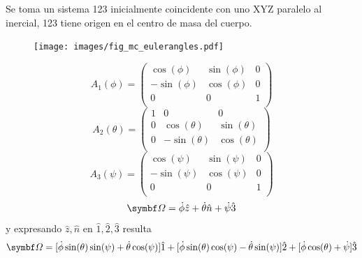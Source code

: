 \documentclass[10pt,oneside]{CBFT_book}
\begin{document}
Se toma un sistema 123 inicialmente coincidente con uno XYZ paralelo al inercial, 123 tiene origen
en el centro de masa del cuerpo.
\begin{figure}[htb]
	\begin{center}
	\texttt{[image: images/fig\_mc\_eulerangles.pdf]}	 
	\end{center}
	\caption{}
\end{figure} 
\[
	A_1(\phi) = 
	\begin{pmatrix}
		\cos(\phi) & \sin(\phi) & 0 \\
		-\sin(\phi) & \cos(\phi) & 0 \\ 
		0 & 0 & 1  \\
	\end{pmatrix}
\]
\[
	A_2(\theta) = 
	\begin{pmatrix}
		1 & 0 & 0 \\
		0 & \cos(\theta) & \sin(\theta) \\ 
		0 & -\sin(\theta) & \cos(\theta)  \\
	\end{pmatrix}
\]
\[
	A_3(\psi) = 
	\begin{pmatrix}
		\cos(\psi) & \sin(\psi) & 0 \\
		-\sin(\psi) & \cos(\psi) & 0 \\ 
		0 & 0 & 1  \\
	\end{pmatrix}
\]
\[
	\vb{\Omega} = \dot{\phi}\hat{z} + \dot{\theta}\hat{n} + \dot{\psi}\hat{3}
\]
y expresando $\hat{z},\hat{n}$ en $\hat{1},\hat{2}, \hat{3}$ resulta
\[
	\vb{\Omega} = [\dot{\phi}\sin(\theta)\sin(\psi) + \dot{\theta}\cos(\psi) ]\hat{1} +
			[\dot{\phi}\sin(\theta)\cos(\psi) - \dot{\theta}\sin(\psi) ] \hat{2} +
			[\dot{\phi}\cos(\theta) + \dot{\psi} ]\hat{3}
\]
\end{document}
